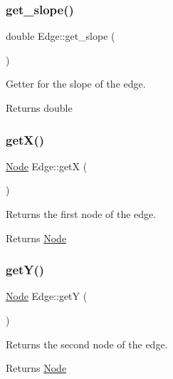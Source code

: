\subsubsection{\texorpdfstring{get\+\_\+slope()}{get\_slope()}}
{\footnotesize\ttfamily double Edge\+::get\+\_\+slope (\begin{DoxyParamCaption}{ }\end{DoxyParamCaption})}



Getter for the slope of the edge. 

\begin{DoxyReturn}{Returns}
double 
\end{DoxyReturn}
\mbox{\label{classEdge_a95807a93235f14fdc8e10a420d49ba23}} 
\subsubsection{\texorpdfstring{get\+X()}{getX()}}
{\footnotesize\ttfamily \hyperlink{classNode}{Node} Edge\+::getX (\begin{DoxyParamCaption}{ }\end{DoxyParamCaption})}



Returns the first node of the edge. 

\begin{DoxyReturn}{Returns}
\hyperlink{classNode}{Node} 
\end{DoxyReturn}
\mbox{\label{classEdge_a6ac7815e007920fbd1ba9fe9180f03c1}} 
\subsubsection{\texorpdfstring{get\+Y()}{getY()}}
{\footnotesize\ttfamily \hyperlink{classNode}{Node} Edge\+::getY (\begin{DoxyParamCaption}{ }\end{DoxyParamCaption})}



Returns the second node of the edge. 

\begin{DoxyReturn}{Returns}
\hyperlink{classNode}{Node} 
\end{DoxyReturn}
\mbox{\label{classEdge_acac0e7451c75c63ea8349a5f1acb9c2d}} 
